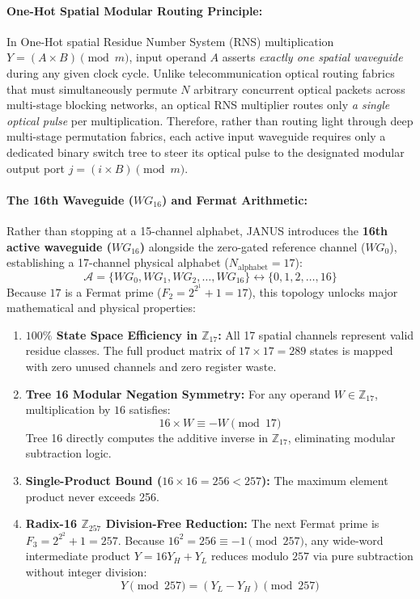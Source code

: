 \documentclass[journal]{IEEEtran}
\begin{document}
\paragraph{\textbf{One-Hot Spatial Modular Routing Principle:}}
In One-Hot spatial Residue Number System (RNS) multiplication $Y = (A \times B) \pmod{m}$, input operand $A$ asserts \textit{exactly one spatial waveguide} during any given clock cycle. Unlike telecommunication optical routing fabrics that must simultaneously permute $N$ arbitrary concurrent optical packets across multi-stage blocking networks, an optical RNS multiplier routes only \textit{a single optical pulse} per multiplication. Therefore, rather than routing light through deep multi-stage permutation fabrics, each active input waveguide requires only a dedicated binary switch tree to steer its optical pulse to the designated modular output port $j = (i \times B) \pmod{m}$.

\paragraph{\textbf{The 16th Waveguide ($WG_{16}$) and Fermat Arithmetic:}}
Rather than stopping at a 15-channel alphabet, JANUS introduces the \textbf{16th active waveguide ($WG_{16}$)} alongside the zero-gated reference channel ($WG_0$), establishing a 17-channel physical alphabet ($N_{\mathrm{alphabet}} = 17$):
\begin{equation}
\mathcal{A} = \{ WG_0, WG_1, WG_2, \dots, WG_{16} \} \longleftrightarrow \{ 0, 1, 2, \dots, 16 \}
\end{equation}
Because $17$ is a Fermat prime ($F_2 = 2^{2^1} + 1 = 17$), this topology unlocks major mathematical and physical properties:
\begin{enumerate}
\item \textbf{$100\%$ State Space Efficiency in $\mathbb{Z}_{17}$:} All 17 spatial channels represent valid residue classes. The full product matrix of $17 \times 17 = 289$ states is mapped with zero unused channels and zero register waste.
\item \textbf{Tree 16 Modular Negation Symmetry:} For any operand $W \in \mathbb{Z}_{17}$, multiplication by $16$ satisfies:
\begin{equation}
16 \times W \equiv -W \pmod{17}
\end{equation}
Tree 16 directly computes the additive inverse in $\mathbb{Z}_{17}$, eliminating modular subtraction logic.
\item \textbf{Single-Product Bound ($16 \times 16 = 256 < 257$):} The maximum element product never exceeds 256.
\item \textbf{Radix-16 $\mathbb{Z}_{257}$ Division-Free Reduction:} The next Fermat prime is $F_3 = 2^{2^2} + 1 = 257$. Because $16^2 = 256 \equiv -1 \pmod{257}$, any wide-word intermediate product $Y = 16 Y_H + Y_L$ reduces modulo $257$ via pure subtraction without integer division:
\begin{equation}
Y \pmod{257} = (Y_L - Y_H) \pmod{257}
\end{equation}
\end{enumerate}
\end{document}

